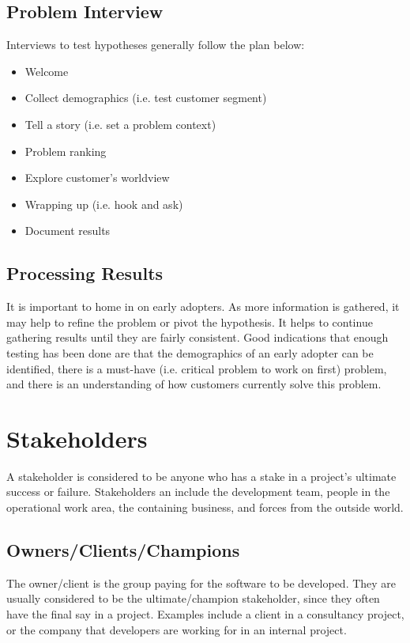 \documentclass[12pt,titlepage]{article}
\begin{document}
    \subsection{Problem Interview}
      Interviews to test hypotheses generally follow the plan below:
      \begin{itemize}
        \item Welcome
        \item Collect demographics (i.e. test customer segment)
        \item Tell a story (i.e. set a problem context)
        \item Problem ranking
        \item Explore customer's worldview
        \item Wrapping up (i.e. hook and ask)
        \item Document results
      \end{itemize}

    \subsection{Processing Results}
      It is important to home in on early adopters. As more information is gathered, it may help to refine the problem or pivot the hypothesis.
      It helps to continue gathering results until they are fairly consistent. Good indications that enough testing has been done are that
      the demographics of an early adopter can be identified, there is a must-have (i.e. critical problem to work on first) problem, and there is
      an understanding of how customers currently solve this problem.

  \newpage

  \section{Stakeholders}
    A stakeholder is considered to be anyone who has a stake in a project's ultimate success or failure. Stakeholders an include the development
    team, people in the operational work area, the containing business, and forces from the outside world.

    \subsection{Owners/Clients/Champions}
      The owner/client is the group paying for the software to be developed. They are usually considered to be the ultimate/champion stakeholder,
      since they often have the final say in a project. Examples include a client in a consultancy project, or the company that developers are working
      for in an internal project.
\end{document}
